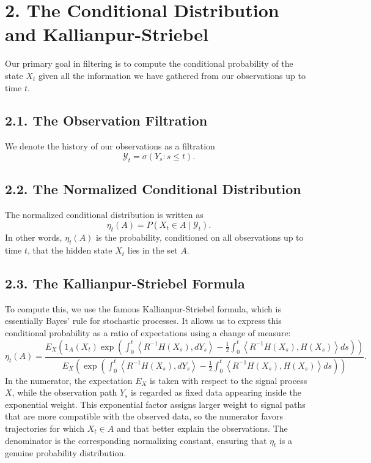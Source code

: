 \documentclass[11pt]{article}
\theoremstyle{definition}
\theoremstyle{remark}
\begin{document}
\section*{2. The Conditional Distribution and Kallianpur-Striebel}
Our primary goal in filtering is to compute the conditional probability of the state $X_t$ given all the information we have gathered from our observations up to time $t$.

\subsection*{2.1. The Observation Filtration}
We denote the history of our observations as a filtration
\[
\mathcal Y_t = \sigma(Y_s:s\le t).
\]

\subsection*{2.2. The Normalized Conditional Distribution}
The normalized conditional distribution is written as
\[
\eta_t(A)=P(X_t\in A\mid \mathcal Y_t).
\]
In other words, $\eta_t(A)$ is the probability, conditioned on all observations up to time $t$, that the hidden state $X_t$ lies in the set $A$.

\subsection*{2.3. The Kallianpur-Striebel Formula}
To compute this, we use the famous Kallianpur-Striebel formula, which is essentially Bayes' rule for stochastic processes. It allows us to express this conditional probability as a ratio of expectations using a change of measure:
\[
\eta_t(A)=
\frac{
E_X\!\left(
1_A(X_t)\exp\left(
\int_0^t \left\langle R^{-1}H(X_s),dY_s\right\rangle
-\frac12\int_0^t \left\langle R^{-1}H(X_s),H(X_s)\right\rangle ds
\right)
\right)
}{
E_X\!\left(
\exp\left(
\int_0^t \left\langle R^{-1}H(X_s),dY_s\right\rangle
-\frac12\int_0^t \left\langle R^{-1}H(X_s),H(X_s)\right\rangle ds
\right)
\right)
}.
\]
In the numerator, the expectation $E_X$ is taken with respect to the signal process $X$, while the observation path $Y_s$ is regarded as fixed data appearing inside the exponential weight.
This exponential factor assigns larger weight to signal paths that are more compatible with the observed data, so the numerator favors trajectories for which $X_t\in A$ and that better explain the observations. The denominator is the corresponding normalizing constant, ensuring that $\eta_t$ is a genuine probability distribution.
\end{document}
